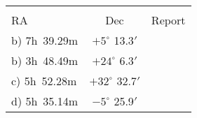 \begin{center}
\begin{tabular}{lcc} \hline \\ [-6pt]
 \hspace{1.5cm}  RA \hspace{1cm} & Dec \hspace{1cm}& \hspace{3cm}Report\hspace{3cm} \\ [6pt]
\hline
b) 7h~39.29m  & $+5^\circ$ 13.3$'$ &     \\ \hline %
b) 3h~48.49m  & $+24^\circ$ 6.3$'$ &     \\ \hline %
c) 5h~52.28m  & $+32^\circ$ 32.7$'$ &  \\ \hline %
d) 5h~35.14m   & $-5^\circ$ 25.9$'$ &    \\ \hline %
  \end{tabular}
\end{center}
